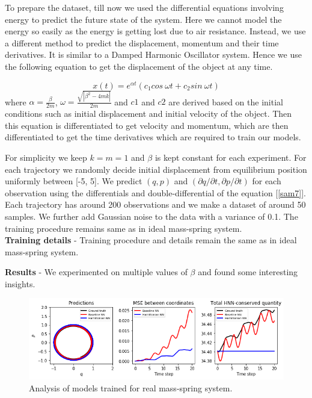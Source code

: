 To prepare the dataset, till now we used the differential equations involving energy to predict the future state of the system. Here we cannot model the energy so easily as the energy is getting lost due to air resistance. Instead, we use a different method to predict the displacement, momentum and their time derivatives. It is similar to a Damped Harmonic Oscillator system. Hence we use the following equation to get the displacement of the object at any time.

\begin{equation}\label{sam7}
    x(t) = e^{\alpha t}(c_1 cos\:\omega t + c_2 sin\:\omega t)
\end{equation}
where \(\alpha = \frac{\beta}{2m}\), \(\omega = \frac{\sqrt{|\beta^2-4mk|}}{2m}\) and \(c1\) and \(c2\) are derived based on the initial conditions such as initial displacement and initial velocity of the object. Then this equation is differentiated to get velocity and momentum, which are then differentiated to get the time derivatives which are required to train our models.

For simplicity we keep \(k = m = 1\) and \(\beta\) is kept constant for each experiment. For each trajectory we randomly decide initial displacement from equilibrium position uniformly between [-5, 5]. We predict \((q, p)\) and \((\partial q/\partial t, \partial p/\partial t)\) for each observation using the differentials and double-differential of the equation [\ref{sam7}]. Each trajectory has around 200 observations and we make a dataset of around 50 samples. We further add Gaussian noise to the data with a variance of 0.1. The training procedure remains same as in ideal mass-spring system.\\
\textbf{Training details} - Training procedure and details remain the same as in ideal mass-spring system.

\textbf{Results} - We experimented on multiple values of \(\beta\) and found some interesting insights.

\begin{figure}[htp]
    \centering
    \includegraphics[width=12cm]{../openreview/realmassspring.png}
    \caption{Analysis of models trained for real mass-spring system.}
    \label{fig:galaxy}
\end{figure}

